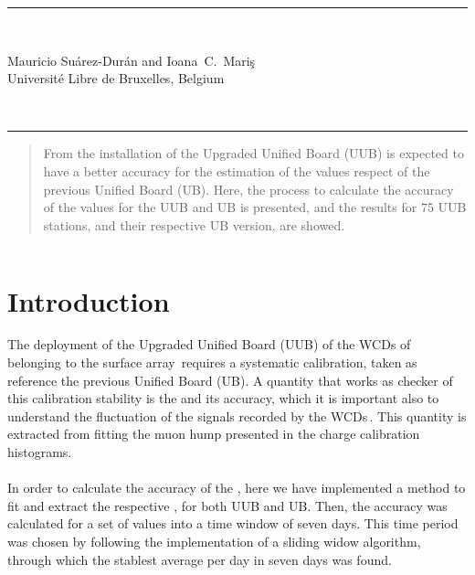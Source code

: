 \documentclass[twoside, final, 10pt]{articleMine}
\begin{document}
\setpagewiselinenumbers
\modulolinenumbers[2]

\linenumbers

\renewcommand\linenumberfont{\small\rmfamily}
\begin{flushright}
\end{flushright}

\begin{flushright}
  \rule{\linewidth}{0.5mm}
  \\[17mm]
  \large
  \parbox[b]{15cm}
  {
    \begin{flushright}
      Mauricio Su\'arez-Dur\'an and  Ioana~C.~Mari\c{s}
      \\[6mm]
      {\small Universit{\'e} Libre de Bruxelles, Belgium}
    \end{flushright}
  }
  \\[5mm]
  \rule{\linewidth}{0.5mm}
\end{flushright}
%
%
\thispagestyle{empty}
\noindent

\begin{abstract}
  \noindent
  From the installation of the Upgraded Unified Board (UUB) is
  expected to have a better accuracy for the estimation of the
  \qpkvem values respect of the previous Unified Board (UB).
  Here, the process to calculate the accuracy of the \qpkvem
  values for the UUB and UB is presented, and the results for
  $75$ UUB stations, and their respective UB version, are showed.
\end{abstract}


\thispagestyle{empty}
$\;$
\noindent
\clearpage

\section{Introduction}
The deployment of the Upgraded Unified Board (UUB) of the WCDs of
belonging to the surface array\,\cite{augerPrimeDesign} requires
a systematic calibration, taken as reference the previous Unified
Board (UB). A quantity that works as checker of this calibration
stability is the \qpkvem and its accuracy, which it is important
also to understand the fluctuation of the signals recorded by the
WCDs\,\cite{gap2003-030}. This quantity is extracted from fitting
the muon hump presented in the charge calibration
histograms.\\\\In order to calculate the accuracy of the \qpkvem,
here we have implemented a method to fit and extract the
respective \qpkvem, for both UUB and UB. Then, the accuracy was
calculated for a set of values into a time window of seven days.
This time period was chosen by following the implementation of a
sliding widow algorithm, through which the stablest \qpkvem
average per day in seven days was found.
\end{document}
